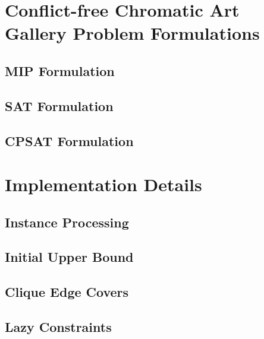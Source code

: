 \chapter{Conflict-free Chromatic Art Gallery Problem Formulations}

\section{MIP Formulation}

\section{SAT Formulation}

\section{CPSAT Formulation}

\chapter{Implementation Details}

\section{Instance Processing}

\section{Initial Upper Bound}

\section{Clique Edge Covers}

\section{Lazy Constraints}